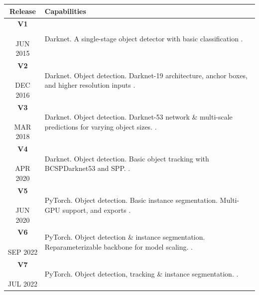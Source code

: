 \documentclass[a4paper,10pt,twocolumn]{article}
\numberwithin{figure}{section}
\numberwithin{table}{section}
\begin{document}
\begin{table}[htbp]
    \centering
    {\small
    \begin{tabularx}{\linewidth}{|c|X|}
        \hline
        \textbf{Release} & \textbf{Capabilities} \\
        \hline
        \makecell[t]{\textbf{V1} \\ \\ {\tiny JUN 2015}} 
        & {\footnotesize Darknet. A single-stage object detector with basic classification
        \citep{redmon2016you}.} \\
        \hline
        \makecell[t]{\textbf{V2} \\ \\ {\tiny DEC 2016}} 
        & {\footnotesize Darknet. Object detection. Darknet-19 architecture, anchor boxes, and higher resolution inputs
        \citep{redmon2016yolo9000betterfasterstronger}.} \\
        \hline
        \makecell[t]{\textbf{V3} \\ \\ {\tiny MAR 2018}} 
        & {\footnotesize Darknet. Object detection. Darknet-53 network \& multi-scale predictions for varying object sizes.
        \citep{redmon2018yolov3}.} \\
        \hline
        \makecell[t]{\textbf{V4} \\ \\ {\tiny APR 2020}} 
        & {\footnotesize Darknet. Object detection. Basic object tracking with BCSPDarknet53 and SPP.
        \citep{bochkovskiy2020yolov4}.} \\
        \hline
        \makecell[t]{\textbf{V5} \\ \\ {\tiny JUN 2020}} 
        & {\footnotesize PyTorch. Object detection. Basic instance segmentation. Multi-GPU support, and exports 
        \citep{ultralytics2024yolov5}.} \\
        \hline
        \makecell[t]{\textbf{V6} \\ \\ {\tiny SEP 2022}} 
        & {\footnotesize PyTorch. Object detection \& instance segmentation. Reparameterizable backbone for model scaling.
        \citep{li2022yolov6}.} \\
        \hline
        \makecell[t]{\textbf{V7} \\ \\ {\tiny JUL 2022}} 
        & {\footnotesize PyTorch. Object detection, tracking \& instance segmentation.
        \citep{wang2022yolov7}.} \\

\end{tabularx}}
\end{table}
\end{document}
